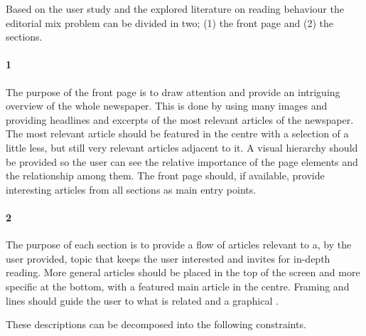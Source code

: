 Based on the user study and the explored literature on reading behaviour the editorial mix problem can be divided in two; (1) the front page and (2) the sections.

\paragraph{1} The purpose of the front page is to draw attention and provide an intriguing overview of the whole newspaper. This is done by using many images and providing headlines and excerpts of the most relevant articles of the newspaper. The most relevant article should be featured in the centre with a selection of a little less, but still very relevant articles adjacent to it. A visual hierarchy should be provided so the user can see the relative importance of the page elements and the relationship among them. The front page should, if available, provide interesting articles from all sections as main entry points.

\paragraph{2} The purpose of each section is to provide a flow of articles relevant to a, by the user provided, topic that keeps the user interested and invites for in-depth reading. More general articles should be placed in the top of the screen and more specific at the bottom, with a featured main article in the centre. Framing and lines should guide the user to what is related and a graphical .

These descriptions can be decomposed into the following constraints.

